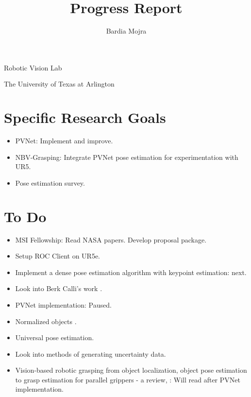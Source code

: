 \documentclass[11pt]{article}
\title{Progress Report}
\author{Bardia Mojra}
\begin{document}
\maketitle
\thispagestyle{empty}

\bigskip
\bigskip
\begin{center}
      Robotic Vision Lab
\end{center}

\begin{center}
      The University of Texas at Arlington
\end{center}

\newpage

\section{Specific Research Goals}
\begin{itemize}
      \item PVNet: Implement and improve.
      \item NBV-Grasping: Integrate PVNet pose estimation for experimentation
      with UR5.
      \item Pose estimation survey.
\end{itemize}

\section{To Do}
\begin{itemize}
      \item MSI Fellowship: Read NASA papers. Develop proposal package.
      \item Setup ROC Client on UR5e.
      \item Implement a dense pose estimation algorithm with keypoint estimation:
      next.
      \item Look into Berk Calli's work \cite{calli2015ycb}.
      \item PVNet implementation: Paused.
      \item Normalized objects \cite{Wang_2019_CVPR}.
      \item Universal pose estimation.
      \item Look into methods of generating uncertainty data.
      \item Vision-based robotic grasping from object localization, object pose
      estimation to grasp estimation for parallel grippers - a review,
      \cite{du2020vision}: Will read after PVNet implementation.
\end{itemize}
\end{document}
